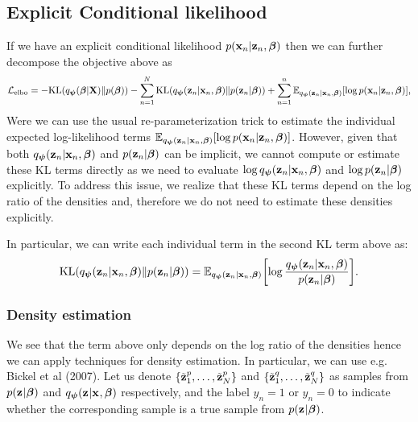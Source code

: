 \documentclass[12pt,a4page]{article}
\begin{document}
	\subsection{Explicit Conditional likelihood}
	If we have an explicit conditional likelihood $\condlike{n}$ then we can further decompose the objective above as 
	\begin{align}
		\elbo = 	 - \kl{\varhyper}{\priorhyper}  -  \sum_{n=1}^N \kl{\varcond{n}}{\prior{n}} +  \sum_{n=1}^n \expectation{\varcond{n}}{\log \condlike{n}} \text{,}
	\end{align}
	Were we can use the usual re-parameterization trick to estimate the individual expected log-likelihood terms $\expectation{\varcond{n}}{\log \condlike{n}}$.
	However, given that both $\varcond{n}$ and $\prior{n}$ can be implicit, we cannot compute or estimate these KL terms directly as we need to evaluate 
	$\log \varcond{n}$  and $\log \prior{n}$ explicitly. To address this issue, we realize that these KL terms depend on the log ratio of the densities and, therefore we do not 
	need to estimate these densities explicitly. 

	In particular, we can write each individual term in the second KL term above as:
	\begin{align}
			\kl{\varcond{n}}{\prior{n}}  = \expectation{\varcond{n}}{\log \frac{\varcond{n}}{\prior{n}}} \text{.}
	\end{align}
	\subsubsection{Density estimation}
	We see that the term above only depends on the log ratio of the densities hence we can apply techniques for density estimation. In particular, we can use e.g. Bickel et al (2007). 
	Let us denote $\{\samplez_1^p, \ldots, \samplez_N^p \}$  and $\{\samplez_{1}^q, \ldots, \samplez_N^q\}$ as samples from $\prior{}$ and $\varcond{}$ respectively, and the label $y_n=1$ or $y_n=0$ to indicate whether the corresponding  sample  is a true sample from $\prior{}$. 
\end{document}

